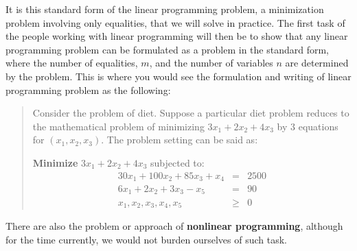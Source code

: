 It is this standard form of the linear programming problem, a minimization problem involving only equalities, that we will solve in practice. The first task of the people working with linear programming will then be to show that any linear programming problem can be formulated as a problem in the standard form, where the number of equalities, $m$, and the number of variables $n$ are determined by the problem. This is where you would see the formulation and writing of linear programming problem as the following: 
\begin{quote}
    Consider the problem of diet. Suppose a particular diet problem reduces to the mathematical problem of minimizing $3x_{1}+2x_{2}+4x_{3}$ by 3 equations for $(x_{1},x_{2},x_{3})$. The problem setting can be said as: 
    \vspace{2mm}

    \textbf{Minimize} $3x_{1}+2x_{2}+4x_{3}$ subjected to: 
    \begin{equation*}
        \begin{matrix}
            30x_{1} + 100x_{2} + 85x_{3} + x_{4} & = & 2500\\
            6x_{1} + 2x_{2} + 3x_{3} - x_{5} & = & 90 \\
            x_{1}, x_{2}, x_{3},x_{4},x_{5} & \geq & 0
        \end{matrix}
    \end{equation*}
\end{quote}
There are also the problem or approach of \textbf{nonlinear programming}, although for the time currently, we would not burden ourselves of such task. 


